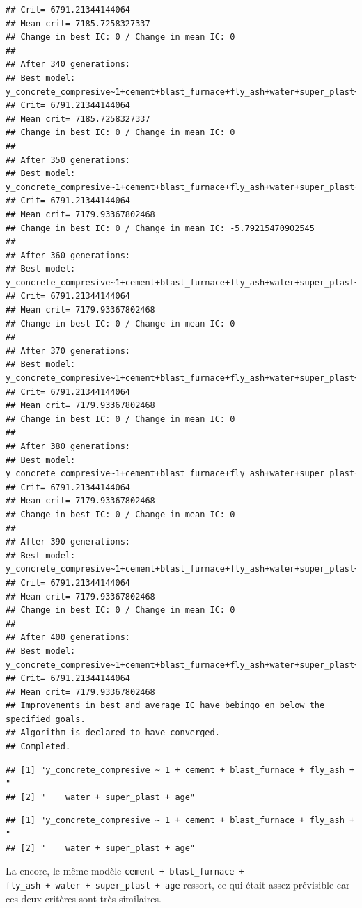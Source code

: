 \documentclass[
  12pt,
]{article}
\begin{document}
\begin{verbatim}
## Crit= 6791.21344144064
## Mean crit= 7185.7258327337
## Change in best IC: 0 / Change in mean IC: 0
## 
## After 340 generations:
## Best model: y_concrete_compresive~1+cement+blast_furnace+fly_ash+water+super_plast+age
## Crit= 6791.21344144064
## Mean crit= 7185.7258327337
## Change in best IC: 0 / Change in mean IC: 0
## 
## After 350 generations:
## Best model: y_concrete_compresive~1+cement+blast_furnace+fly_ash+water+super_plast+age
## Crit= 6791.21344144064
## Mean crit= 7179.93367802468
## Change in best IC: 0 / Change in mean IC: -5.79215470902545
## 
## After 360 generations:
## Best model: y_concrete_compresive~1+cement+blast_furnace+fly_ash+water+super_plast+age
## Crit= 6791.21344144064
## Mean crit= 7179.93367802468
## Change in best IC: 0 / Change in mean IC: 0
## 
## After 370 generations:
## Best model: y_concrete_compresive~1+cement+blast_furnace+fly_ash+water+super_plast+age
## Crit= 6791.21344144064
## Mean crit= 7179.93367802468
## Change in best IC: 0 / Change in mean IC: 0
## 
## After 380 generations:
## Best model: y_concrete_compresive~1+cement+blast_furnace+fly_ash+water+super_plast+age
## Crit= 6791.21344144064
## Mean crit= 7179.93367802468
## Change in best IC: 0 / Change in mean IC: 0
## 
## After 390 generations:
## Best model: y_concrete_compresive~1+cement+blast_furnace+fly_ash+water+super_plast+age
## Crit= 6791.21344144064
## Mean crit= 7179.93367802468
## Change in best IC: 0 / Change in mean IC: 0
## 
## After 400 generations:
## Best model: y_concrete_compresive~1+cement+blast_furnace+fly_ash+water+super_plast+age
## Crit= 6791.21344144064
## Mean crit= 7179.93367802468
## Improvements in best and average IC have bebingo en below the specified goals.
## Algorithm is declared to have converged.
## Completed.
\end{verbatim}

\begin{verbatim}
## [1] "y_concrete_compresive ~ 1 + cement + blast_furnace + fly_ash + "
## [2] "    water + super_plast + age"
\end{verbatim}

\begin{verbatim}
## [1] "y_concrete_compresive ~ 1 + cement + blast_furnace + fly_ash + "
## [2] "    water + super_plast + age"
\end{verbatim}

La encore, le même modèle \texttt{cement\ +\ blast\_furnace\ +}
\texttt{fly\_ash\ +\ water\ +\ super\_plast\ +\ age} ressort, ce qui
était assez prévisible car ces deux critères sont très similaires.
\end{document}
